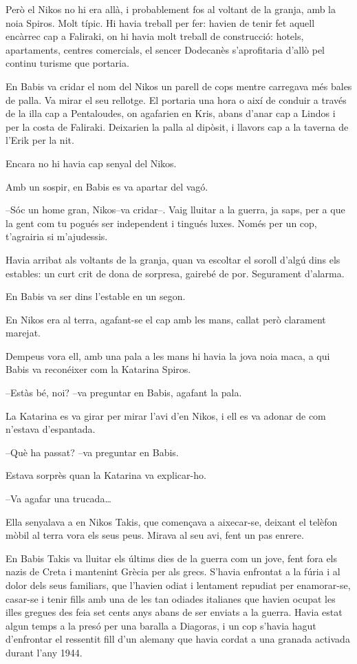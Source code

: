 Però el Nikos no hi era allà, i probablement fos al voltant de la
granja, amb la noia Spiros. Molt típic. Hi havia treball per fer: havien
de tenir fet aquell encàrrec cap a Faliraki, on hi havia molt treball de
construcció: hotels, apartaments, centres comercials, el sencer
Dodecanès s'aprofitaria d'allò pel continu turisme que portaria.

En Babis va cridar el nom del Nikos un parell de cops mentre carregava
més bales de palla. Va mirar el seu rellotge. El portaria una hora o
així de conduir a través de la illa cap a Pentaloudes, on agafarien en
Kris, abans d'anar cap a Lindos i per la costa de Faliraki. Deixarien la
palla al dipòsit, i llavors cap a la taverna de l'Erik per la nit.

Encara no hi havia cap senyal del Nikos.

Amb un sospir, en Babis es va apartar del vagó.

--Sóc un home gran, Nikos--va cridar--. Vaig lluitar a la guerra, ja
saps, per a que la gent com tu pogués ser independent i tingués luxes.
Només per un cop, t'agrairia si m'ajudessis.

Havia arribat als voltants de la granja, quan va escoltar el soroll
d'algú dins els estables: un curt crit de dona de sorpresa, gairebé de
por. Segurament d'alarma.

En Babis va ser dins l'estable en un segon.

En Nikos era al terra, agafant-se el cap amb les mans, callat però
clarament marejat.

Dempeus vora ell, amb una pala a les mans hi havia la jova noia maca, a
qui Babis va reconéixer com la Katarina Spiros.

--Estàs bé, noi? --va preguntar en Babis, agafant la pala.

La Katarina es va girar per mirar l'avi d'en Nikos, i ell es va adonar
de com n'estava d'espantada.

--Què ha passat? --va preguntar en Babis.

Estava sorprès quan la Katarina va explicar-ho.

--Va agafar una trucada\ldots{}

Ella senyalava a en Nikos Takis, que començava a aixecar-se, deixant el
telèfon mòbil al terra vora els seus peus. Mirava al seu avi, fent un
pas enrere.

En Babis Takis va lluitar els últims dies de la guerra com un jove, fent
fora els nazis de Creta i mantenint Grècia per als grecs. S'havia
enfrontat a la fúria i al dolor dels seus familiars, que l'havien odiat
i lentament repudiat per enamorar-se, casar-se i tenir fills amb una de
les tan odiades italianes que havien ocupat les illes gregues des feia
set cents anys abans de ser enviats a la guerra. Havia estat algun temps
a la presó per una baralla a Diagoras, i un cop s'havia hagut
d'enfrontar el ressentit fill d'un alemany que havia cordat a una
granada activada durant l'any 1944.

